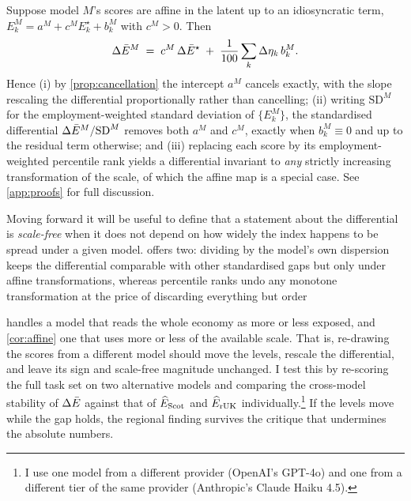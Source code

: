 \begin{corollary}\label{cor:affine}
Suppose model $M$'s scores are affine in the latent up to an idiosyncratic term,
$E^{M}_k = a^{M} + c^{M} E^{\star}_k + b^{M}_k$ with $c^{M} > 0$. Then
\begin{equation}\label{eq:cor2}
\Delta\bar{E}^{M} \;=\; c^{M}\, \Delta\bar{E}^{\star} \;+\;
\frac{1}{100} \sum_k \Delta\eta_k\, b^{M}_k .
\end{equation}
Hence (i) by \cref{prop:cancellation} the intercept $a^{M}$ cancels exactly, with the slope rescaling the differential proportionally rather than cancelling; (ii) writing $\mathrm{SD}^{M}$ for the employment-weighted standard deviation of $\{E^{M}_k\}$, the standardised differential $\Delta\bar{E}^{M}/\mathrm{SD}^{M}$ removes both $a^{M}$ and $c^{M}$, exactly when $b^{M}_k \equiv 0$ and up to the residual term otherwise; and (iii) replacing each score by its employment-weighted percentile rank yields a differential invariant to \emph{any} strictly increasing transformation of the scale, of which the affine map is a special case. See \cref{app:proofs} for full discussion.
\end{corollary}

\noindent
Moving forward it will be useful to define that a statement about the differential is \textit{scale-free} when it does not depend on how widely the index happens to be spread under a given model. 
 offers two: dividing by the model’s own dispersion keeps the differential comparable
with other standardised gaps but only under affine transformations, whereas percentile ranks undo any monotone transformation at the price of discarding everything but order

 handles a model that reads the whole economy as more or less exposed, and \cref{cor:affine} one that uses more or less of the available scale. That is, re-drawing the scores from a different model should move the levels, rescale the differential, and leave its sign and scale-free magnitude unchanged. I test this by re-scoring the full task set on two alternative models and comparing the cross-model stability of $\Delta\bar{E}$ against that of $\widehat{E}_{\mathrm{Scot}}$ and $\widehat{E}_{\mathrm{rUK}}$ individually.\footnote{I use one model from a different provider (OpenAI's GPT-4o) and one from a different tier of the same provider (Anthropic's Claude Haiku 4.5).} If the levels move while the gap holds, the regional finding survives the critique that undermines the absolute numbers.

